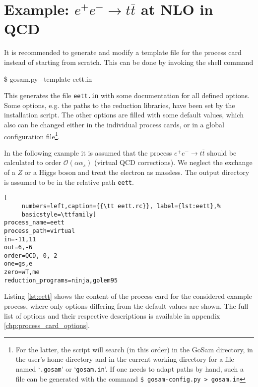 \documentclass[11pt,a4paper]{refrep}
\newcommand{\gosamversion}{{3{.}0}}
\newcommand{\gosamv}[1][\gosamversion]{{\sc GoSam}\xspace}
\begin{document}
\section{Example: \texorpdfstring{$e^+e^-\rightarrow t\bar{t}$}{e+e- to tt-bar}
at NLO in QCD}

It is recommended to generate and modify a template file for the 
process card instead of
starting from scratch. This can be done by invoking the shell command
\begin{example}
\$ gosam.py --template eett.in
\end{example}
This generates the file \texttt{eett.in} with some documentation
for all defined options. Some options, e.g. the paths to the reduction libraries, 
have been set by the installation script.
The other options are filled with some default values,
which also can be changed either in the individual process cards, 
or in a global configuration file\footnote{
For the latter, the script will search (in this order) in the \gosamv{} directory,
in the user's home directory and in the current working directory for a file
named `\texttt{.gosam}' or `\texttt{gosam.in}'. If one needs to adapt paths by
hand, such a file can be generated with the command
{\tt \$ gosam-config.py > gosam.in}}.

In the following  example it is assumed that the process
$e^+e^-\rightarrow t\bar{t}$ should be calculated to order
$\mathcal{O}(\alpha\alpha_s)$ (virtual QCD corrections).
We neglect the exchange of a $Z$ or a Higgs boson and treat the electron as massless.
The output directory is assumed to be in the relative path
\texttt{eett}. 

\begin{lstlisting}[
     numbers=left,caption={{\tt eett.rc}}, label={lst:eett},%
     basicstyle=\ttfamily] 
process_name=eett
process_path=virtual
in=-11,11
out=6,-6
order=QCD, 0, 2
one=gs,e
zero=wT,me
reduction_programs=ninja,golem95
\end{lstlisting}

Listing \ref{lst:eett} shows the content of the process card for the considered example process, where only options differing from the default values are shown. The full list of options and their respective descriptions is available in appendix \ref{chp:process_card_options}. 
\end{document}
